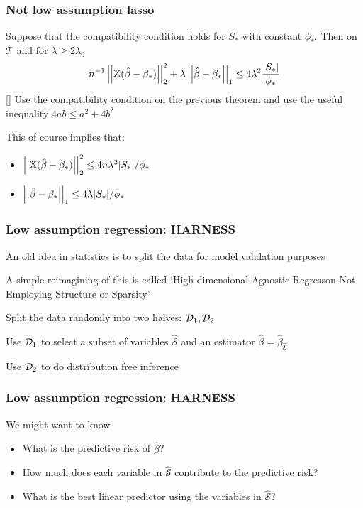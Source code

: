 \documentclass[12pt]{beamer}
\begin{document}
  \begin{frame}
  \frametitle{Not low assumption lasso}
Suppose that the compatibility condition holds for $S_*$ with constant $\phi_*$.  Then on $\mathcal{T}$ and
for $\lambda \geq 2 \lambda_0$
\[
n^{-1}\left|\left| \mathbb{X}(\hat\beta - \beta_*) \right|\right|_2^2 + \lambda \left|\left| \hat\beta - \beta_* \right|\right|_1 \leq 4 \lambda^2 \frac{|S_*|}{\phi_*}
\]
[] Use the compatibility condition on the previous theorem and use the useful
inequality $4ab \leq a^2 + 4b^2$
\vsp

This of course implies that:
\begin{itemize}
\item $\left|\left| \mathbb{X}(\hat\beta - \beta_*) \right|\right|_2^2 \leq 4n\lambda^2|S_*| / \phi_*$
\item $\left|\left| \hat\beta - \beta_* \right|\right|_1 \leq 4 \lambda |S_*|/\phi_*$
\end{itemize}
\end{frame}


  \begin{frame}
  \frametitle{Low assumption regression: HARNESS}
  An old idea in statistics is to split the data for model validation purposes
  
  \vsp
  A simple reimagining of this is called  `High-dimensional Agnostic Regresson Not Employing Structure or Sparsity'
  
  
  \vsp
  Split the data randomly into two halves: $\mathcal{D}_1,\mathcal{D}_2$
  
  \vsp
Use $\mathcal{D}_1$ to select a subset of variables $\hat{\mathcal{S}}$ 
and an estimator $\hat\beta = \hat\beta_{\hat{\mathcal{S}}}$


\vsp
 Use $\mathcal{D}_2$ to do distribution free inference
\end{frame}



  \begin{frame}
  \frametitle{Low assumption regression: HARNESS}
We might want to know
\begin{itemize}
\item What is the predictive risk of $\hat\beta$?
\item How much does each variable in $\hat{\mathcal{S}}$ contribute to the predictive risk?
\item What is the best linear predictor using the variables in $\hat{\mathcal{S}}$?
\end{itemize}
\end{frame}
\end{document}
